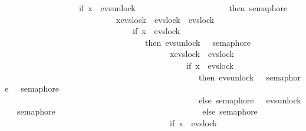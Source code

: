 \begin{isabellebody}
\ \ \ \ \ \ \ \ \ \ \ \ \ \ \ \ \ {\isasymrightarrow}\ {\isacharparenleft}{\kern0pt}if\ x\ {\isacharequal}{\kern0pt}\ evs{\isachardot}{\kern0pt}unlock\ {}\isanewline
\ \ \ \ \ \ \ \ \ \ \ \ \ \ \ \ \ \ \ \ \ then\ semaphore\ {}\isanewline
\ \ \ \ \ \ \ \ \ \ \ \ \ \ \ \ \ \ \ \ \ \ \ \ \ \ {\isacharbar}{\kern0pt}{\isacharbar}{\kern0pt}{\isacharbar}{\kern0pt}\ {\isasymbox}x{\isasymin}{\isacharbraceleft}{\kern0pt}evs{\isachardot}{\kern0pt}lock\ {}{\isacharcomma}{\kern0pt}\ evs{\isachardot}{\kern0pt}lock\ {}{\isacharcomma}{\kern0pt}\ evs{\isachardot}{\kern0pt}lock\ {}{\isacharbraceright}{\kern0pt}\isanewline
\ \ \ \ \ \ \ \ \ \ \ \ \ \ \ \ \ \ \ \ \ \ \ \ \ \ \ \ \ \ {\isasymrightarrow}\ {\isacharparenleft}{\kern0pt}if\ x\ {\isacharequal}{\kern0pt}\ evs{\isachardot}{\kern0pt}lock\ {}\isanewline
\ \ \ \ \ \ \ \ \ \ \ \ \ \ \ \ \ \ \ \ \ \ \ \ \ \ \ \ \ \ \ \ \ \ then\ evs{\isachardot}{\kern0pt}unlock\ {}\ {\isasymrightarrow}\ semaphore\ {}\isanewline
\ \ \ \ \ \ \ \ \ \ \ \ \ \ \ \ \ \ \ \ \ \ \ \ \ \ \ \ \ \ \ \ \ \ \ \ \ \ \ {\isacharbar}{\kern0pt}{\isacharbar}{\kern0pt}{\isacharbar}{\kern0pt}\ {\isasymbox}x{\isasymin}{\isacharbraceleft}{\kern0pt}evs{\isachardot}{\kern0pt}lock\ {}{\isacharcomma}{\kern0pt}\ evs{\isachardot}{\kern0pt}lock\ {}{\isacharbraceright}{\kern0pt}\isanewline
\ \ \ \ \ \ \ \ \ \ \ \ \ \ \ \ \ \ \ \ \ \ \ \ \ \ \ \ \ \ \ \ \ \ \ \ \ \ \ \ \ \ \ {\isasymrightarrow}\ {\isacharparenleft}{\kern0pt}if\ x\ {\isacharequal}{\kern0pt}\ evs{\isachardot}{\kern0pt}lock\ {}\ \isanewline
\ \ \ \ \ \ \ \ \ \ \ \ \ \ \ \ \ \ \ \ \ \ \ \ \ \ \ \ \ \ \ \ \ \ \ \ \ \ \ \ \ \ \ \ \ \ \ then\ evs{\isachardot}{\kern0pt}unlock\ {}\ {\isasymrightarrow}\ semaphore\ {}\ {\isacharbar}{\kern0pt}{\isacharbar}{\kern0pt}{\isacharbar}{\kern0pt}\ semaphore\ {}\isanewline
\ \ \ \ \ \ \ \ \ \ \ \ \ \ \ \ \ \ \ \ \ \ \ \ \ \ \ \ \ \ \ \ \ \ \ \ \ \ \ \ \ \ \ \ \ \ \ else\ semaphore\ {}\ {\isacharbar}{\kern0pt}{\isacharbar}{\kern0pt}{\isacharbar}{\kern0pt}\ evs{\isachardot}{\kern0pt}unlock\ {}\ {\isasymrightarrow}\ semaphore\ {}{\isacharparenright}{\kern0pt}\isanewline
\ \ \ \ \ \ \ \ \ \ \ \ \ \ \ \ \ \ \ \ \ \ \ \ \ \ \ \ \ \ \ \ \ \ else\ semaphore\ \ {}\isanewline
\ \ \ \ \ \ \ \ \ \ \ \ \ \ \ \ \ \ \ \ \ \ \ \ \ \ \ \ \ \ \ \ \ \ \ \ \ \ \ {\isacharbar}{\kern0pt}{\isacharbar}{\kern0pt}{\isacharbar}{\kern0pt}\ {\isacharparenleft}{\kern0pt}if\ x\ {\isacharequal}{\kern0pt}\ evs{\isachardot}{\kern0pt}lock\ {}\ \isanewline

\end{isabellebody}
